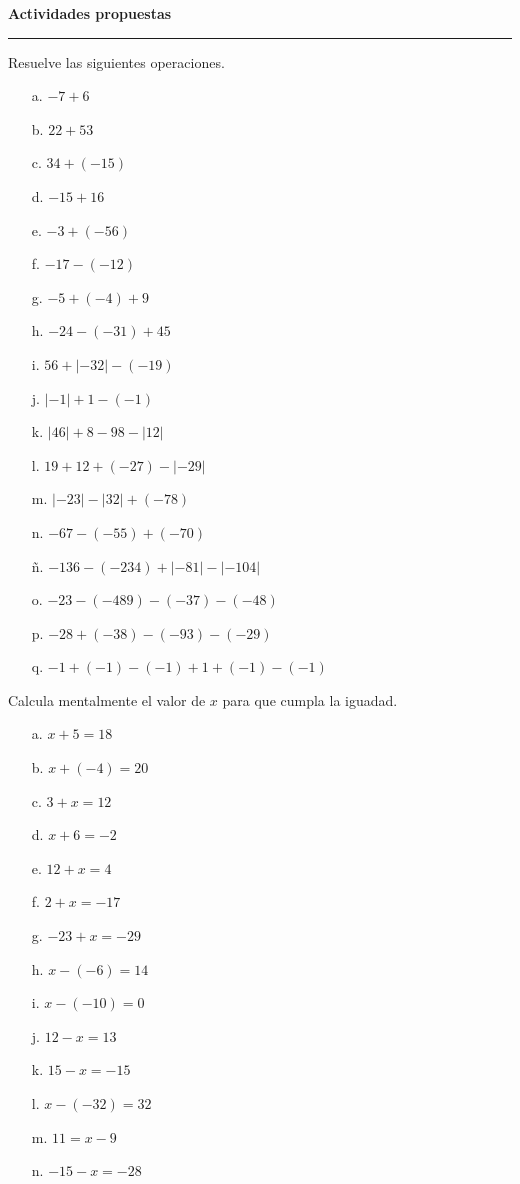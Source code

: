 \documentclass[spanish,letterpaper, 11pt, addpoints, answers]{exam}
\begin{document}
\begin{questions}
\begin{itemize}
  \end{itemize}
  
  \parbox{6in}{
  \textbf{Actividades propuestas}}
  \vspace{0.15in}
  \hrule 


\question Resuelve las siguientes operaciones.

\begin{multicols}{2}
  


\begin{itemize}
  \item[a.] $-7+6$
  \item[b.] $22+53$
  \item[c.] $34+(-15)$
  \item[d.] $-15+16$
  \item[e.] $-3+(-56)$
  \item[f.] $-17-(-12)$
  \item[g.] $-5+(-4)+9$
  \item[h.] $-24-(-31)+45$
  \item[i.] $56+|-32|-(-19)$
  \item[j.] $|-1|+1-(-1)$
  \item[k.] $|46|+8-98-|12|$
  \item[l.] $19+12+(-27)-|-29|$
  \item[m.] $|-23|-|32|+(-78)$
  \item[n.] $-67-(-55)+(-70)$
  \item[ñ.] $-136-(-234)+|-81|-|-104|$
  \item[o.] $-23-(-489)-(-37)-(-48)$
  \item[p.] $-28+(-38)-(-93)-(-29)$
  \item[q.] $-1+(-1)-(-1)+1+(-1)-(-1)$             
\end{itemize}

\end{multicols}

\question Calcula mentalmente el valor de $x$ para que cumpla la iguadad.

\begin{multicols}{2}

\begin{itemize}
  \item[a.] $x+5=18$
  \item[b.] $x+(-4)=20$
  \item[c.] $3+x=12$
  \item[d.] $x+6=-2$
  \item[e.] $12+x=4$
  \item[f.] $2+x=-17$
  \item[g.] $-23+x=-29$
  \item[h.] $x-(-6)=14$
  \item[i.] $x-(-10)=0$
  \item[j.] $12-x=13$
  \item[k.] $15-x=-15$
  \item[l.] $x-(-32)=32$
  \item[m.] $11=x-9$
  \item[n.] $-15-x=-28$
         

\end{itemize}
\end{multicols}
\end{questions}
\end{document}

